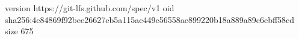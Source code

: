 version https://git-lfs.github.com/spec/v1
oid sha256:4c84869f92bee26627eb5a115ac449e56558ae899220b18a889a89c6ebff58cd
size 675
